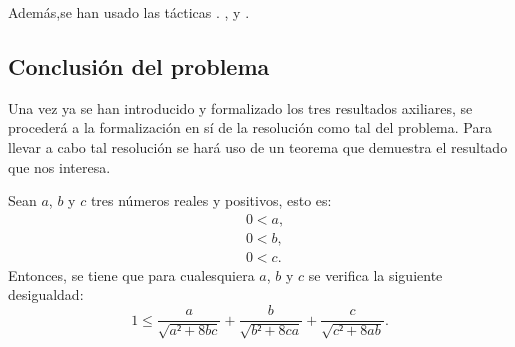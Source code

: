 Además,se han usado las tácticas
.
,
 y
.


\subsection{Conclusión del problema}
Una vez ya se han introducido y formalizado los tres resultados
axiliares, se procederá a la formalización en sí de la resolución
como tal del problema. Para llevar a cabo tal resolución se hará uso
de un teorema que demuestra el resultado que nos interesa.

\begin{teorema}
  Sean \(a\), \(b\) y \(c\) tres números reales y positivos, esto es:
  \begin{align}
    &0<a, \label{haq2te}\tag{ha}\\
    &0<b, \label{hbq2te}\tag{hb}\\
    &0<c. \label{hcq2te}\tag{hc}
  \end{align}
  Entonces, se tiene que para cualesquiera \(a\), \(b\) y \(c\) se
  verifica la siguiente desigualdad:
  \begin{equation}\label{eqfinal}
    1≤\frac{a}{\sqrt{a²+8bc}}+\frac{b}{\sqrt{b²+8ca}}+
    \frac{c}{\sqrt{c²+8ab}}.
  \end{equation}
\end{teorema}

